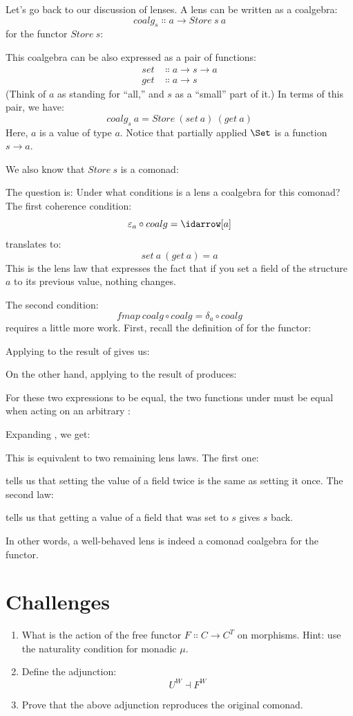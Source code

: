 Let's go back to our discussion of lenses. A lens can be written as a
coalgebra:
\[coalg_s \Colon a \to Store\ s\ a\]
for the functor $Store\ s$:

This coalgebra can be also expressed as a pair of functions:
\begin{align*}
set &\Colon a \to s \to a \\
get &\Colon a \to s
\end{align*}
(Think of $a$ as standing for ``all,'' and $s$ as a
``small'' part of it.) In terms of this pair, we have:
\[coalg_s\ a = Store\ (set\ a)\ (get\ a)\]
Here, $a$ is a value of type $a$. Notice that partially
applied $\Set$ is a function $s \to a$.

We also know that $Store\ s$ is a comonad:

The question is: Under what conditions is a lens a coalgebra for this
comonad? The first coherence condition:
\[\varepsilon_a \circ coalg = \idarrow[a]\]
translates to:
\[set\ a\ (get\ a) = a\]
This is the lens law that expresses the fact that if you set a field of
the structure $a$ to its previous value, nothing changes.

The second condition:
\[fmap\ coalg \circ coalg = \delta_a \circ coalg\]
requires a little more work. First, recall the definition of
 for the  functor:

Applying  to the result of  gives us:

On the other hand, applying  to the result of
 produces:

For these two expressions to be equal, the two functions under
 must be equal when acting on an arbitrary :

Expanding , we get:

This is equivalent to two remaining lens laws. The first one:

tells us that setting the value of a field twice is the same as setting
it once. The second law:

tells us that getting a value of a field that was set to $s$
gives $s$ back.

In other words, a well-behaved lens is indeed a comonad coalgebra for
the  functor.

\section{Challenges}

\begin{enumerate}
\tightlist
\item
  What is the action of the free functor
  $F \Colon C \to C^T$ on morphisms. Hint: use the
  naturality condition for monadic $\mu$.
\item
  Define the adjunction:
\[U^W \dashv F^W\]
\item
  Prove that the above adjunction reproduces the original comonad.
\end{enumerate}

